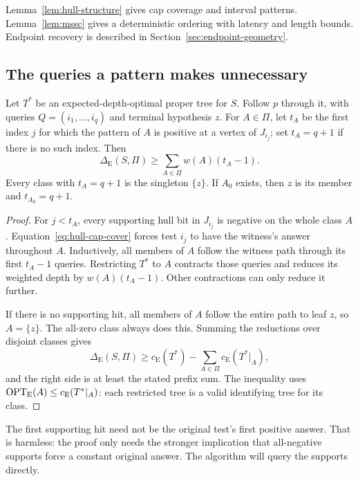 Lemma~\ref{lem:hull-structure} gives cap coverage and interval
patterns. Lemma~\ref{lem:mssc} gives a deterministic ordering with
latency and length bounds. Endpoint recovery is described in
Section~\ref{sec:endpoint-geometry}.

\subsection{The queries a pattern makes unnecessary}

\begin{lemma}\label{lem:support-prefix}
Let $T^*$ be an expected-depth-optimal proper tree for $S$.
Follow $p$ through it, with queries $Q=(i_1,\ldots,i_q)$ and terminal
hypothesis $z$.
For $A\in\Pi$, let $t_A$ be the first index $j$ for which the pattern
of $A$ is positive at a vertex of $J_{i_j}$; set $t_A=q+1$ if there
is no such index.
Then
\begin{equation}\label{eq:support-prefix-credit}
 \Delta_{\mathrm E}(S,\Pi)\ge
 \sum_{A\in\Pi}w(A)(t_A-1).
\end{equation}
Every class with $t_A=q+1$ is the singleton $\{z\}$.
If $A_0$ exists, then $z$ is its member and $t_{A_0}=q+1$.
\end{lemma}
\begin{proof}
For $j<t_A$, every supporting hull bit in $J_{i_j}$ is negative on
the whole class $A$. Equation~\eqref{eq:hull-cap-cover} forces
test $i_j$ to have the witness's answer throughout $A$.
Inductively, all members of $A$ follow the witness path through
its first $t_A-1$ queries. Restricting $T^*$ to $A$ contracts
those queries and reduces its weighted depth by
$w(A)(t_A-1)$. Other contractions can only reduce it further.

If there is no supporting hit, all members of $A$ follow the
entire path to leaf $z$, so $A=\{z\}$. The all-zero class always
does this. Summing the reductions over disjoint classes gives
\[
 \Delta_{\mathrm E}(S,\Pi)\ge
 c_{\mathrm E}(T^*)-\sum_{A\in\Pi}c_{\mathrm E}(T^*|_A),
\]
and the right side is at least the stated prefix sum.
The inequality uses $\operatorname{OPT}_{\mathrm E}(A)\le c_{\mathrm E}(T^*|_A)$: each restricted tree
is a valid identifying tree for its class.
\end{proof}

The first supporting hit need not be the original test's first
positive answer. That is harmless: the proof only needs the
stronger implication that all-negative supports force a constant
original answer. The algorithm will query the supports directly.

